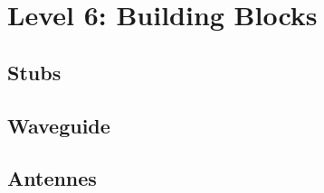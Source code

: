 
\section{Level 6: Building Blocks}
\subsection{Stubs}
\subsection{Waveguide}
\subsection{Antennes}
